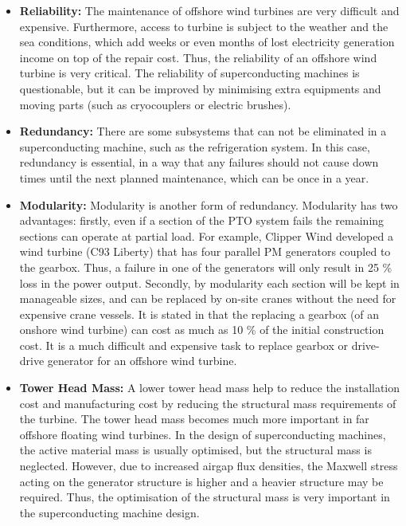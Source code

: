 \documentclass[12pt]{IET02}
\begin{document}
\begin{itemize}
  \item \textbf{Reliability:} The maintenance of offshore wind turbines are very difficult and expensive. Furthermore, access to turbine is subject to the weather and the sea conditions, which add weeks or even months of lost electricity generation income on top of the repair cost. Thus, the reliability of an offshore wind turbine is very critical. The reliability of superconducting machines is questionable, but it can be improved by minimising extra equipments and moving parts (such as cryocouplers or electric brushes). 

  \item \textbf{Redundancy:} There are some subsystems that can not be eliminated in a superconducting machine, such as the refrigeration system. In this case, redundancy is essential, in a way that any failures should not cause down times until the next planned maintenance, which can be once in a year.

  \item \textbf{Modularity:} Modularity is another form of redundancy. Modularity has two advantages: firstly, even if a section of the PTO system fails the remaining sections can operate at partial load. For example, Clipper Wind developed a wind turbine (C93 Liberty) that has four parallel PM generators coupled to the gearbox. Thus, a failure in one of the generators will only result in 25 \% loss in the power output. Secondly, by modularity each section will be kept in manageable sizes, and can be replaced by on-site cranes without the need for expensive crane vessels. It is stated in \cite{Kaiser2007} that the replacing a gearbox (of an onshore wind turbine) can cost as much as 10 \% of the initial construction cost. It is a much difficult and expensive task to replace gearbox or drive-drive generator for an offshore wind turbine.

  \item \textbf{Tower Head Mass:} A lower tower head mass help to reduce the installation cost and manufacturing cost by reducing the structural mass requirements of the turbine. The tower head mass becomes much more important in far offshore floating wind turbines. In the design of superconducting machines, the active material mass is usually optimised, but the structural mass is neglected. However, due to increased airgap flux densities, the Maxwell stress acting on the generator structure is higher and a heavier structure may be required. Thus, the optimisation of the structural mass is very important in the superconducting machine design.


\end{itemize}
\end{document}
